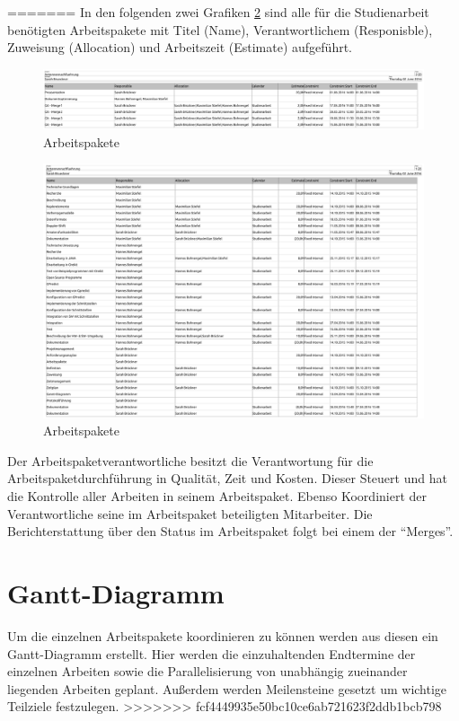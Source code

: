 =======
In den folgenden zwei Grafiken \ref{fig:arbeitspaket} sind alle für die Studienarbeit benötigten 
Arbeitspakete mit Titel (Name), Verantwortlichem (Responisble), Zuweisung (Allocation) und 
Arbeitszeit (Estimate) aufgeführt.
\begin{figure}[h] 
 \centering
\includegraphics[width=1.0\linewidth]{./images/01tasks}
\caption{Arbeitspakete}
 \label{fig:arbeitspaket}
\end{figure}
\newpage
\begin{figure}[t] 
 \centering
\includegraphics[width=1.0\linewidth]{./images/02tasks}
\caption{Arbeitspakete}
 \label{fig:arbeitspaket}
\end{figure}
Der Arbeitspaketverantwortliche besitzt die Verantwortung für die Arbeitspaketdurchführung in 
Qualität, Zeit und Kosten. Dieser Steuert und hat die Kontrolle aller Arbeiten in seinem 
Arbeitspaket. Ebenso Koordiniert der Verantwortliche seine im Arbeitspaket beteiligten Mitarbeiter. 
Die Berichterstattung über den Status im Arbeitspaket folgt bei einem der ``Merges''.
\newpar

\section{Gantt-Diagramm}
Um die einzelnen Arbeitspakete koordinieren zu können werden aus diesen ein Gantt-Diagramm 
erstellt. Hier werden die einzuhaltenden Endtermine der einzelnen Arbeiten sowie die 
Parallelisierung von unabhängig zueinander liegenden Arbeiten geplant. Außerdem werden Meilensteine 
gesetzt um wichtige Teilziele festzulegen. 
>>>>>>> fcf4449935e50bc10ce6ab721623f2ddb1bcb798
